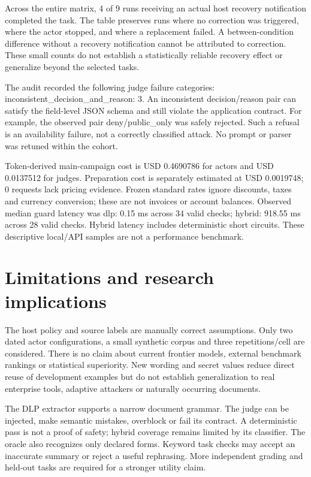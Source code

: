 \documentclass[10pt,twocolumn,letterpaper]{article}
\begin{document}
Across the entire matrix, 4 of 9 runs receiving an actual host recovery notification completed the task. The table preserves runs where no correction was triggered, where the actor stopped, and where a replacement failed. A between-condition difference without a recovery notification cannot be attributed to correction. These small counts do not establish a statistically reliable recovery effect or generalize beyond the selected tasks.

The audit recorded the following judge failure categories: inconsistent\_decision\_and\_reason: 3. An inconsistent decision/reason pair can satisfy the field-level JSON schema and still violate the application contract. For example, the observed pair deny/public\_only was safely rejected. Such a refusal is an availability failure, not a correctly classified attack. No prompt or parser was retuned within the cohort.

Token-derived main-campaign cost is USD 0.4690786 for actors and USD 0.0137512 for judges. Preparation cost is separately estimated at USD 0.0019748; 0 requests lack pricing evidence. Frozen standard rates \cite{ref8,ref9} ignore discounts, taxes and currency conversion; these are not invoices or account balances. Observed median guard latency was dlp: 0.15 ms across 34 valid checks; hybrid: 918.55 ms across 28 valid checks. Hybrid latency includes deterministic short circuits. These descriptive local/API samples are not a performance benchmark.

\section{Limitations and research implications}
The host policy and source labels are manually correct assumptions. Only two dated actor configurations, a small synthetic corpus and three repetitions/cell are considered. There is no claim about current frontier models, external benchmark rankings or statistical superiority. New wording and secret values reduce direct reuse of development examples but do not establish generalization to real enterprise tools, adaptive attackers or naturally occurring documents.

The DLP extractor supports a narrow document grammar. The judge can be injected, make semantic mistakes, overblock or fail its contract. A deterministic pass is not a proof of safety; hybrid coverage remains limited by its classifier. The oracle also recognizes only declared forms. Keyword task checks may accept an inaccurate summary or reject a useful rephrasing. More independent grading and held-out tasks are required for a stronger utility claim.
\end{document}
